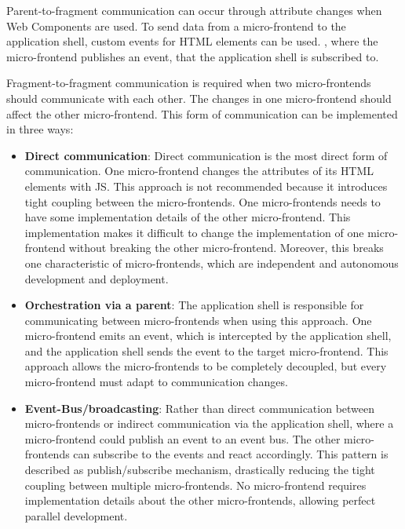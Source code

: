 \bigskip

\noindent Parent-to-fragment communication can occur through attribute changes when Web Components are used. \cite[58-59]{book:2019:farrell:background:micro-frontends:web-components-in-action} To send data from a micro-frontend to the application shell, custom events for \ac{HTML} elements can be used. \cite[315]{book:2019:farrell:background:micro-frontends:web-components-in-action}, where the micro-frontend publishes an event, that the application shell is subscribed to. \cite{book:2020:geers:background:micro-frontends:micro-frontends-in-action}

\bigskip

\noindent Fragment-to-fragment communication is required when two micro-frontends should communicate with each other. The changes in one micro-frontend should affect the other micro-frontend. This form of communication can be implemented in three ways: \cite[107-108]{book:2020:geers:background:micro-frontends:micro-frontends-in-action}

\begin{itemize}
  \item \textbf{Direct communication}: Direct communication is the most direct form of communication. One micro-frontend changes the attributes of its \ac{HTML} elements with \ac{JS}. This approach is not recommended because it introduces tight coupling between the micro-frontends. One micro-frontends needs to have some implementation details of the other micro-frontend. This implementation makes it difficult to change the implementation of one micro-frontend without breaking the other micro-frontend. Moreover, this breaks one characteristic of micro-frontends, which are independent and autonomous development and deployment.
  \item \textbf{Orchestration via a parent}: The application shell is responsible for communicating between micro-frontends when using this approach. One micro-frontend emits an event, which is intercepted by the application shell, and the application shell sends the event to the target micro-frontend. This approach allows the micro-frontends to be completely decoupled, but every micro-frontend must adapt to communication changes.
  \item \textbf{Event-Bus/broadcasting}: Rather than direct communication between micro-frontends or indirect communication via the application shell, where a micro-frontend could publish an event to an event bus. The other micro-frontends can subscribe to the events and react accordingly. This pattern is described as publish/subscribe mechanism, drastically reducing the tight coupling between multiple micro-frontends. No micro-frontend requires implementation details about the other micro-frontends, allowing perfect parallel development.
\end{itemize}
